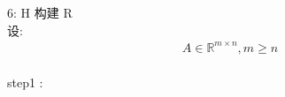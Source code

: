 \documentclass[12pt]{article}
\begin{document}
\begin{flushleft}
    6: H 构建 R \\
    设: \\
    \begin{align}
        A \in \mathbb{R}^{m \times n}, m \geq n
    \end{align} \\
    step1 : \\








\end{flushleft}
\end{document}
